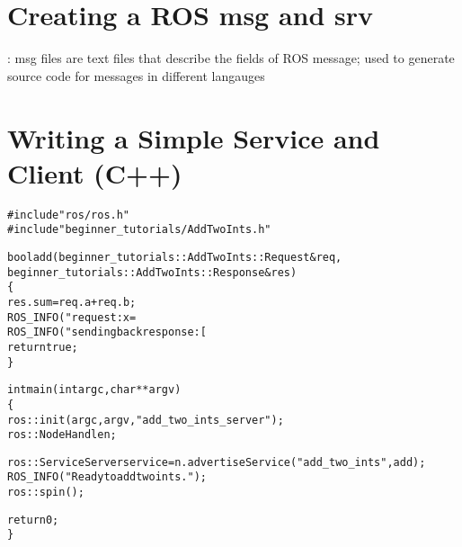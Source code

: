 \documentclass{note}
\begin{document}
\section{Creating a ROS msg and srv}
\bit
\w {}: msg files are text files that describe the fields of ROS message;
used to generate source code for messages in different langauges
\eit

\section{Writing a Simple Service and Client (C++)}
\begin{alltt}
#include "ros/ros.h"
#include "beginner_tutorials/AddTwoInts.h"

bool add(beginner_tutorials::AddTwoInts::Request  &req,
         beginner_tutorials::AddTwoInts::Response &res)
\{
  res.sum = req.a + req.b;
  ROS_INFO("request: x=%ld, y=%ld", (long int)req.a, (long int)req.b);
  ROS_INFO("sending back response: [%ld]", (long int)res.sum);
  return true;
\}

int main(int argc, char **argv)
\{
  ros::init(argc, argv, "add_two_ints_server");
  ros::NodeHandle n;

  ros::ServiceServer service = n.advertiseService("add_two_ints", add);
  ROS_INFO("Ready to add two ints.");
  ros::spin();
 
  return 0;
\}
\end{alltt}
\end{document}
